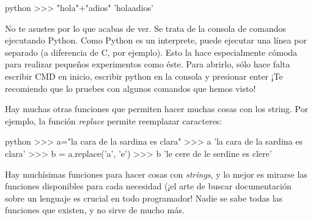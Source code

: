 \documentclass{article}
\begin{document}
\begin{mintedbox}{python}
>>> "hola"+"adios"
'holaadios'
\end{mintedbox}

No te asustes por lo que acabas de ver. Se trata de la consola de comandos ejecutando Python. Como Python es un interprete, puede ejecutar una línea por separado (a diferencia de C, por ejemplo). Esto la hace especialmente cómoda para realizar pequeños experimentos como éste. Para abrirlo, sólo hace falta escribir CMD en inicio, escribir python en la consola y presionar enter ¡Te recomiendo que lo pruebes con algunos comandos que hemos visto!

Hay muchas otras funciones que permiten hacer muchas cosas con los string. Por ejemplo, la función \textit{replace} permite reemplazar caracteres:


\begin{mintedbox}{python}
>>> a="la cara de la sardina es clara"
>>> a
'la cara de la sardina es clara'
>>> b = a.replace('a', 'e')
>>> b
'le cere de le serdine es clere'
\end{mintedbox}
 
 
Hay muchísimas funciones para hacer cosas con \textit{strings}, y lo mejor es mirarse las funciones disponibles para cada necesidad (¡el arte de buscar documentación sobre un lenguaje es crucial en todo programador! Nadie se sabe todas las funciones que existen, y no sirve de mucho más. 
\end{document}
